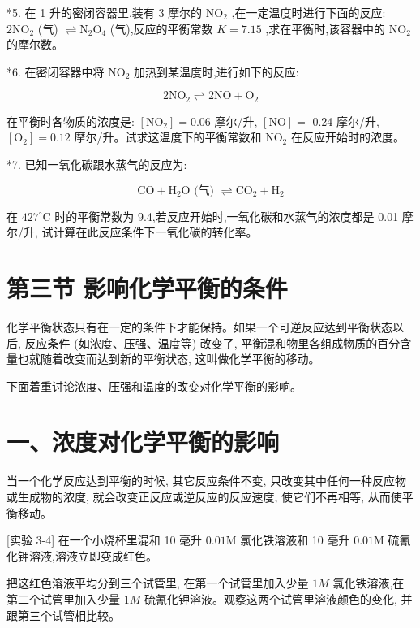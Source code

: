 \documentclass[10pt]{article}
\begin{document}
*5. 在 1 升的密闭容器里,装有 3 摩尔的 \({\mathrm{{NO}}}_{2}\) ,在一定温度时进行下面的反应: \(2{\mathrm{{NO}}}_{2}\) (气) \(\rightleftharpoons {\mathrm{N}}_{2}{\mathrm{O}}_{4}\) (气),反应的平衡常数 \(K = {7.15}\) ,求在平衡时,该容器中的 \({\mathrm{{NO}}}_{2}\) 的摩尔数。

*6. 在密闭容器中将 \({\mathrm{{NO}}}_{2}\) 加热到某温度时,进行如下的反应:

\[
2{\mathrm{{NO}}}_{2} \rightleftharpoons 2\mathrm{{NO}} + {\mathrm{O}}_{2}
\]

在平衡时各物质的浓度是: \(\left\lbrack {\mathrm{{NO}}}_{2}\right\rbrack = {0.06}\) 摩尔/升, \(\left\lbrack \mathrm{{NO}}\right\rbrack =\) 0.24 摩尔/升, \(\left\lbrack {\mathrm{O}}_{2}\right\rbrack = {0.12}\) 摩尔/升。试求这温度下的平衡常数和 \({\mathrm{{NO}}}_{2}\) 在反应开始时的浓度。

*7. 已知一氧化碳跟水蒸气的反应为:

\[
\mathrm{{CO}} + {\mathrm{H}}_{2}\mathrm{O}\text{ (气) } \rightleftharpoons {\mathrm{{CO}}}_{2} + {\mathrm{H}}_{2}
\]

在 \({427}^{ \circ }\mathrm{C}\) 时的平衡常数为 9.4,若反应开始时,一氧化碳和水蒸气的浓度都是 0.01 摩尔/升, 试计算在此反应条件下一氧化碳的转化率。

\section*{第三节 影响化学平衡的条件}

化学平衡状态只有在一定的条件下才能保持。如果一个可逆反应达到平衡状态以后, 反应条件 (如浓度、压强、温度等) 改变了, 平衡混和物里各组成物质的百分含量也就随着改变而达到新的平衡状态, 这叫做化学平衡的移动。

下面着重讨论浓度、压强和温度的改变对化学平衡的影响。

\section*{一、浓度对化学平衡的影响}

当一个化学反应达到平衡的时候, 其它反应条件不变, 只改变其中任何一种反应物或生成物的浓度, 就会改变正反应或逆反应的反应速度, 使它们不再相等, 从而使平衡移动。

[实验 3-4] 在一个小烧杯里混和 10 毫升 \({0.01}\mathrm{M}\) 氯化铁溶液和 10 毫升 \({0.01}\mathrm{M}\) 硫氰化钾溶液,溶液立即变成红色。

把这红色溶液平均分到三个试管里, 在第一个试管里加入少量 \({1M}\) 氯化铁溶液,在第二个试管里加入少量 \({1M}\) 硫氰化钾溶液。观察这两个试管里溶液颜色的变化, 并跟第三个试管相比较。
\end{document}

